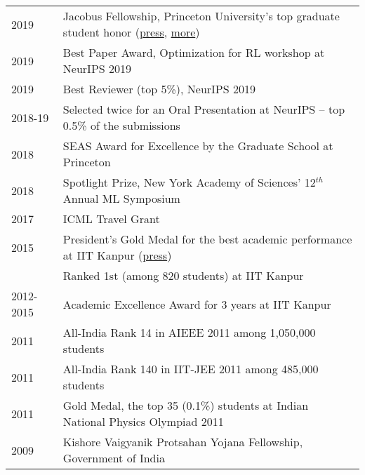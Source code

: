 \documentclass{scrartcl}
\newcommand{\spacedlowallcaps}[1]{{\Large\textls[80]{\scshape \MakeTextLowercase{#1}}}}
\begin{document}
\begin{cv}{}
\begin{center}
    \begin{tabularx}{\textwidth}{ l l }
     2019 & {Jacobus Fellowship}, Princeton University's top graduate student honor (\href{https://www.princeton.edu/news/2020/02/13/four-win-jacobus-fellowship-princetons-top-graduate-student-honor}{press}, \href{https://www.dailyprincetonian.com/article/2020/02/four-graduate-students-named-jacobus-fellows}{more})\\ 
     2019 & {Best Paper Award}, Optimization for RL workshop at NeurIPS 2019 \\
     2019 & Best Reviewer (top 5\%), NeurIPS 2019\\
     2018-19 & Selected {twice} for an {Oral Presentation} at NeurIPS -- top 0.5\% of the submissions \\
     2018 & {SEAS Award for Excellence} by the Graduate School at Princeton\\  
     2018 & {Spotlight Prize}, New York Academy of Sciences' 12$^{th}$ Annual ML Symposium \\
     2017 & ICML Travel Grant \\
     2015 & {President's Gold Medal} for the best academic performance at IIT Kanpur (\href{https://timesofindia.indiatimes.com/director-iit-k-prof-indranil-manna-informed-that-while-the-presidents-gold-medal-will-be-given-to-karan-singh-of-computer-science-and-engineering-department-directors-gold-medal-will-be-awarded-to-sarthak-chandra-of-physics-department-/articleshow/47568494.cms}{press})\\
     & Ranked 1st (among
     820 students) at IIT Kanpur\\
     2012-2015 & Academic Excellence Award for 3 years at IIT Kanpur \\
     2011 & All-India Rank 14 in AIEEE
     2011 among 1,050,000 students \\
     2011 & All-India Rank 140 in IIT-JEE 2011 among 485,000 students\\
     2011 & Gold Medal, the top 35 (0.1\%) students at Indian
     National Physics Olympiad 2011\\
     2009 & Kishore Vaigyanik Protsahan Yojana Fellowship, Government of India    
    \end{tabularx}
\end{center}

\vspace{1.5em}

\noindent\spacedlowallcaps{Peer-reviewed Publications} 


\end{cv}
\end{document}
